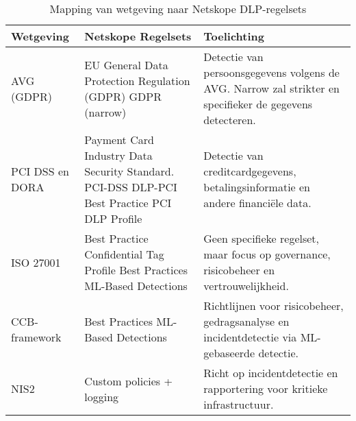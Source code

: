 \begin{table}[h]
    \centering
    \small
    \begin{tabular}{p{3cm}p{5cm}p{7cm}}
        \toprule
        \textbf{Wetgeving} & \textbf{Netskope Regelsets} & \textbf{Toelichting} \\
        \midrule
        AVG (GDPR) & 
        EU General Data Protection Regulation (GDPR) \newline 
        GDPR (narrow) & 
        Detectie van persoonsgegevens volgens de AVG. Narrow zal strikter en specifieker de gegevens detecteren. \\
        
        PCI DSS en DORA & 
        Payment Card Industry Data Security Standard. PCI-DSS \newline 
        DLP-PCI \newline 
        Best Practice PCI DLP Profile & 
        Detectie van creditcardgegevens, betalingsinformatie en andere financiële data. \\
        
        ISO 27001 & 
        Best Practice Confidential Tag Profile \newline 
        Best Practices ML-Based Detections & 
        Geen specifieke regelset, maar focus op governance, risicobeheer en vertrouwelijkheid. \\
        
        CCB-framework & 
        Best Practices ML-Based Detections & 
        Richtlijnen voor risicobeheer, gedragsanalyse en incidentdetectie via ML-gebaseerde detectie. \\
        
        NIS2 & 
        Custom policies + logging & 
        Richt op incidentdetectie en rapportering voor kritieke infrastructuur. \\
        \bottomrule
    \end{tabular}
    \caption{Mapping van wetgeving naar Netskope DLP-regelsets}
    \label{tab:Netskope regelsets}
\end{table}


